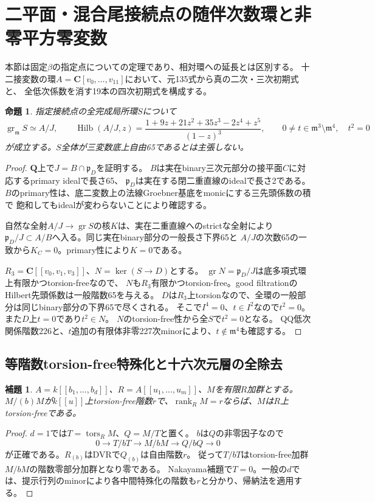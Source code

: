 \documentclass[11pt,a4paper]{ltjsarticle}
\newcommand{\CC}{\mathbf C}
\newcommand{\QQ}{\mathbf Q}
\DeclareMathOperator{\rank}{rank}
\newtheorem{proposition}[theorem]{命題}
\newtheorem{lemma}[theorem]{補題}
\theoremstyle{remark}
\begin{document}
\section{二平面・混合尾接続点の随伴次数環と非零平方零変数}
本節は固定$\beta$の指定点についての定理であり、相対環への延長とは区別する。
十二接変数の環$A=\CC[v_0,\ldots,v_{11}]$において、元135式から真の二次・三次初期式と、
全低次係数を消す19本の四次初期式を構成する。
\begin{proposition}
指定接続点の全完成局所環$S$について
\[
 \operatorname{gr}_{\mathfrak m}S\simeq A/J,\qquad
 \operatorname{Hilb}(A/J,z)=
 \frac{1+9z+21z^2+35z^3-2z^4+z^5}{(1-z)^3},
 \qquad 0\ne t\in\mathfrak m^3\setminus\mathfrak m^4,\quad t^2=0
\]
が成立する。$S$全体が三変数底上自由65であるとは主張しない。
\end{proposition}
\begin{proof}
$\QQ$上で$J=B\cap\mathfrak p_D$を証明する。
$B$は実在binary三次元部分の接平面$C$に対応するprimary idealで長さ65、
$\mathfrak p_D$は実在する閉二重直線のidealで長さ2である。
$B$のprimary性は、底二変数上の法線Groebner基底をmonicにする三先頭係数の積で
飽和してもidealが変わらないことにより確認する。

自然な全射$A/J\to\operatorname{gr}S$の核$K$は、実在二重直線へのstrictな全射により
$\mathfrak p_D/J\subset A/B$へ入る。同じ実在binary部分の一般長さ下界65と
$A/J$の次数65の一致から$K_C=0$。primary性により$K=0$である。

$R_3=\CC[[v_0,v_1,v_3]]$、$N=\ker(S\to D)$とする。
$\operatorname{gr}N=\mathfrak p_D/J$は底多項式環上有限かつtorsion-freeなので、
$N$も$R_3$有限かつtorsion-free。good filtrationのHilbert先頭係数は一般階数65を与える。
$D$は$R_3$上torsionなので、全環の一般部分は同じbinary部分の下界65で尽くされる。
そこで$I^4=0$、$t\in I^2$なので$t^2=0$。また$D$上$t=0$であり$t^2\in N$。
$N$のtorsion-free性から全$S$で$t^2=0$となる。
QQ低次関係階数226と、$t$追加の有限体非零227次minorにより、$t\notin\mathfrak m^4$も確認する\cite{binary-mixed-formal-v40}。
\end{proof}
\subsection{等階数torsion-free特殊化と十六次元層の全除去}
\begin{lemma}
$A=k[[b_1,\ldots,b_d]]$、$R=A[[u_1,\ldots,u_m]]$、$M$を有限$R$加群とする。
$M/(b)M$が$k[[u]]$上torsion-free階数$r$で、$\rank_R M=r$ならば、$M$は$R$上torsion-freeである。
\end{lemma}
\begin{proof}
$d=1$では$T=\operatorname{tors}_R M$、$Q=M/T$と置く。
$b$は$Q$の非零因子なので
\[
 0\longrightarrow T/bT\longrightarrow M/bM\longrightarrow Q/bQ\longrightarrow0
\]
が正確である。$R_{(b)}$はDVRで$Q_{(b)}$は自由階数$r$。
従って$T/bT$はtorsion-free加群$M/bM$の階数零部分加群となり零である。
Nakayama補題で$T=0$。一般の$d$では、提示行列のminorにより各中間特殊化の階数も$r$と分かり、帰納法を適用する。
\end{proof}
\end{document}

